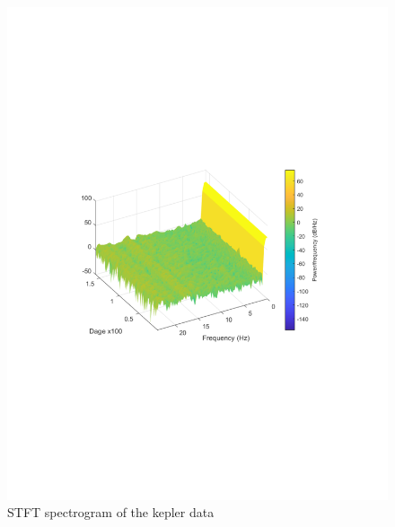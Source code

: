 \begin{figure}[h]
  \centering
  \includegraphics[width=\textwidth]{matlabstuff/mesh_stft.pdf}
  \caption{STFT spectrogram of the kepler data}%
  \label{fig:STFT}
\end{figure}
